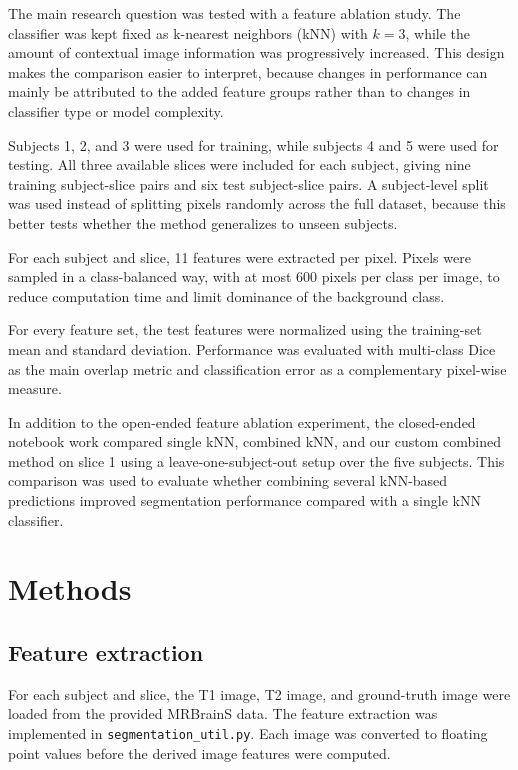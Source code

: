 \documentclass[10pt,a4paper,twoside]{article}
\begin{document}
The main research question was tested with a feature ablation study. The classifier was kept fixed as k-nearest neighbors (kNN) with $k=3$, while the amount of contextual image information was progressively increased. This design makes the comparison easier to interpret, because changes in performance can mainly be attributed to the added feature groups rather than to changes in classifier type or model complexity.

Subjects 1, 2, and 3 were used for training, while subjects 4 and 5 were used for testing. All three available slices were included for each subject, giving nine training subject-slice pairs and six test subject-slice pairs. A subject-level split was used instead of splitting pixels randomly across the full dataset, because this better tests whether the method generalizes to unseen subjects.

For each subject and slice, 11 features were extracted per pixel. Pixels were sampled in a class-balanced way, with at most 600 pixels per class per image, to reduce computation time and limit dominance of the background class.

For every feature set, the test features were normalized using the training-set mean and standard deviation. Performance was evaluated with multi-class Dice as the main overlap metric and classification error as a complementary pixel-wise measure.

In addition to the open-ended feature ablation experiment, the closed-ended notebook work compared single kNN, combined kNN, and our custom combined method on slice 1 using a leave-one-subject-out setup over the five subjects. This comparison was used to evaluate whether combining several kNN-based predictions improved segmentation performance compared with a single kNN classifier.
\section{Methods}

\subsection{Feature extraction}

For each subject and slice, the T1 image, T2 image, and ground-truth image were loaded from the provided MRBrainS data. The feature extraction was implemented in \texttt{segmentation\_util.py}. Each image was converted to floating point values before the derived image features were computed.
\end{document}
